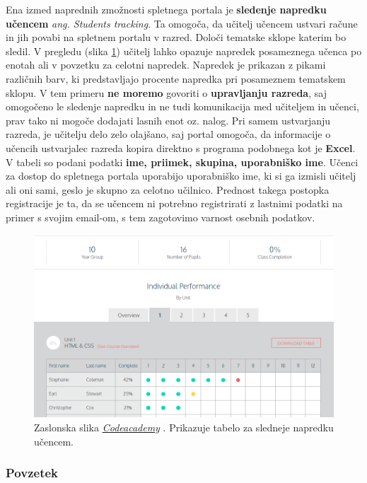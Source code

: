 Ena izmed naprednih zmožnosti spletnega portala je \textbf{sledenje
  napredku učencem} \emph{ang. Students tracking}. Ta omogoča, da
učitelj učencem ustvari račune in jih povabi na spletnem portalu v
razred. Določi tematske sklope katerim bo sledil. V pregledu (slika
\ref{fig:scr:web:codeacademy:tracking}) učitelj lahko opazuje napredek
posameznega učenca po enotah ali v povzetku za celotni
napredek. Napredek je prikazan z pikami različnih barv, ki
predstavljajo procente napredka pri posameznem tematskem sklopu. V tem
primeru \textbf{ne moremo} govoriti o \textbf{upravljanju razreda},
saj omogočeno le sledenje napredku in ne tudi komunikacija med
učiteljem in učenci, prav tako ni mogoče dodajati lasnih enot
oz. nalog. Pri samem ustvarjanju razreda, je učitelju delo zelo
olajšano, saj portal omogoča, da informacije o učencih ustvarjalec
razreda kopira direktno s programa podobnega kot je \textbf{Excel}. V
tabeli so podani podatki \textbf{ime, priimek, skupina, uporabniško
  ime}. Učenci za dostop do spletnega portala uporabijo uporabniško
ime, ki si ga izmisli učitelj ali oni sami, geslo je skupno za celotno
učilnico. Prednost takega postopka registracije je ta, da se učencem
ni potrebno registrirati z lastnimi podatki na primer s svojim
email-om, s tem zagotovimo varnost osebnih podatkov.

\begin{figure}[h!]
  \centering
    \includegraphics [width=0.65\linewidth, keepaspectratio =
   1] {./images/sc_web/codeacademy_tracking_01.png}
   \caption{Zaslonska slika
     \emph{\href{https://www.codecademy.com/}{Codeacademy}}
     \cite{web:codeacademy}. Prikazuje tabelo za sledneje napredku
     učencem.}
    \label{fig:scr:web:codeacademy:tracking}
\end{figure}


\subsubsection{Povzetek}

